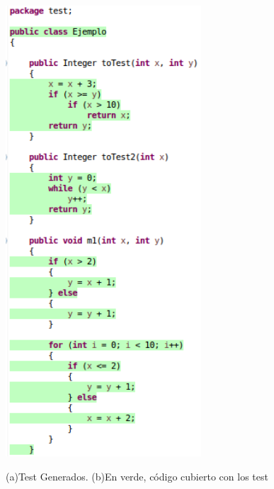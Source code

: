 \documentclass{llncs}
\begin{document}
\begin{figure}[hbt!]
\begin{minipage}[H]{0.55\textwidth}
  \centering
  \includegraphics[width=0.65\textwidth]{screenshots/eclemma}\\
\end{minipage}
\caption{(a)Test Generados. (b)En verde, código cubierto con los test}
\end{figure}
\end{document}

